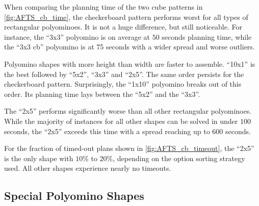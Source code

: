When comparing the planning time of the two cube patterns in \autoref{fig:AFTS_cb_time}, the checkerboard pattern performs worst for all types of rectangular polyominoes.
It is not a huge difference, but still noticeable.
For instance, the ``3x3'' polyomino is on average at $50$ seconds planning time, while the ``3x3 cb'' polyomino is at 75 seconds with a wider spread and worse outliers.

Polyomino shapes with more height than width are faster to assemble.
``10x1'' is the best followed by ``5x2'', ``3x3'' and ``2x5''.
The same order persists for the checkerboard pattern.
Surprisingly, the ``1x10'' polyomino breaks out of this order.
Its planning time lays between the ``5x2'' and the ``3x3''.

The ``2x5'' performs significantly worse than all other rectangular polyominoes.
While the majority of instances for all other shapes can be solved in under $100$ seconds, the ``2x5'' exceeds this time with a spread reaching up to $600$ seconds.

For the fraction of timed-out plans shown in \autoref{fig:AFTS_cb_timeout}, the ``2x5'' is the only shape with $10\%$ to $20\%$, depending on the option sorting strategy used.
All other shapes experience nearly no timeouts.

\subsection{Special Polyomino Shapes}
\label{sec:special_poly}

